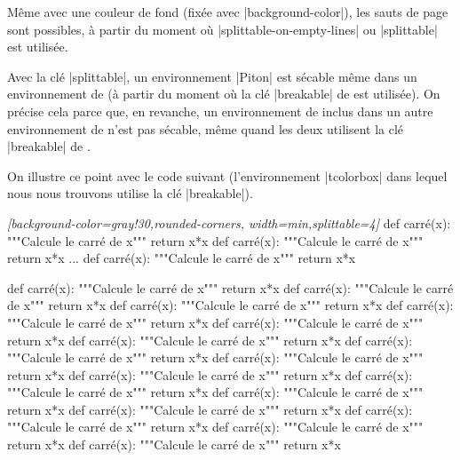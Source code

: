 \documentclass[dvipsnames,svgnames]{article}
\begin{document}
\medskip
\begin{tcolorbox}[breakable]
Même avec une couleur de fond (fixée avec |background-color|), les sauts de page sont
possibles, à partir du moment où |splittable-on-empty-lines| ou |splittable| est
utilisée.

\medskip
Avec la clé |splittable|, un environnement |{Piton}| est sécable même dans un
environnement de  (à partir du moment où la clé |breakable| de
 est utilisée). On précise cela parce que, en revanche, un
environnement de  inclus dans un autre environnement de
 n'est pas sécable, même quand les deux utilisent la clé
|breakable| de .

\medskip
On illustre ce point avec le code suivant (l'environnement |{tcolorbox}| dans lequel nous
nous trouvons utilise la clé |breakable|).

\medskip
\begin{Code}
\begin{Piton}\emph{[background-color=gray!30,rounded-corners,
  width=min,splittable=4]}
def carré(x):
    """Calcule le carré de x"""
    return x*x
def carré(x):
    """Calcule le carré de x"""
    return x*x
...    
def carré(x):
    """Calcule le carré de x"""
    return x*x
\end{Piton}
\end{Code}

\bigskip
\begin{Piton}[background-color=gray!30,rounded-corners,width=min,splittable=4]
def carré(x):
    """Calcule le carré de x"""
    return x*x
def carré(x):
    """Calcule le carré de x"""
    return x*x
def carré(x):
    """Calcule le carré de x"""
    return x*x
def carré(x):
    """Calcule le carré de x"""
    return x*x 
def carré(x):
    """Calcule le carré de x"""
    return x*x
def carré(x):
    """Calcule le carré de x"""
    return x*x
def carré(x):
    """Calcule le carré de x"""
    return x*x
def carré(x):
    """Calcule le carré de x"""
    return x*x
def carré(x):
    """Calcule le carré de x"""
    return x*x
def carré(x):
    """Calcule le carré de x"""
    return x*x
def carré(x):
    """Calcule le carré de x"""
    return x*x
def carré(x):
    """Calcule le carré de x"""
    return x*x
def carré(x):
    """Calcule le carré de x"""
    return x*x
def carré(x):
    """Calcule le carré de x"""
    return x*x
def carré(x):
    """Calcule le carré de x"""
    return x*x
\end{Piton}

\end{tcolorbox}
\end{document}
